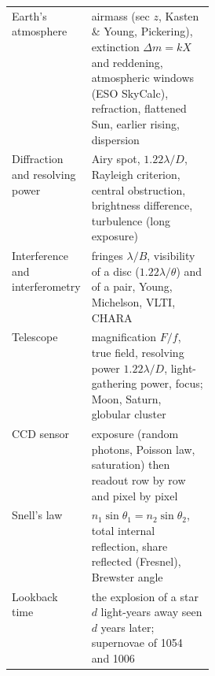 \begin{center}
\begin{tabularx}{\linewidth}{@{}>{\raggedright}p{0.30\linewidth}X@{}}
Earth's atmosphere & airmass (sec $z$, Kasten \& Young, Pickering), extinction $\Delta m = kX$ and reddening, atmospheric windows (ESO SkyCalc), refraction, flattened Sun, earlier rising, dispersion\\
Diffraction and resolving power & Airy spot, $1.22\lambda/D$, Rayleigh criterion, central obstruction, brightness difference, turbulence (long exposure)\\
Interference and interferometry & fringes $\lambda/B$, visibility of a disc ($1.22\lambda/\theta$) and of a pair, Young, Michelson, VLTI, CHARA\\
Telescope & magnification $F/f$, true field, resolving power $1.22\lambda/D$, light-gathering power, focus; Moon, Saturn, globular cluster\\
CCD sensor & exposure (random photons, Poisson law, saturation) then readout row by row and pixel by pixel\\
Snell's law & $n_1\sin\theta_1=n_2\sin\theta_2$, total internal reflection, share reflected (Fresnel), Brewster angle\\
Lookback time & the explosion of a star $d$ light-years away seen $d$ years later; supernovae of 1054 and 1006\\
\bottomrule
\end{tabularx}
\end{center}


